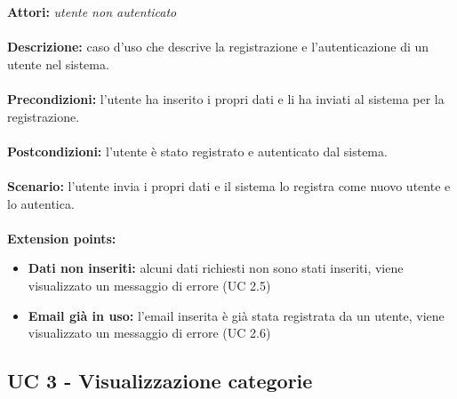 \documentclass[a4paper,11pt]{article}
\begin{document}
\textbf{Attori:} \textit{utente non autenticato}
\\ \\
\textbf{Descrizione:} caso d'uso che descrive la registrazione e l'autenticazione di un utente nel sistema.\\
\\
\textbf{Precondizioni:} l'utente ha inserito i propri dati e li ha inviati al sistema per la registrazione.\\
\\
\textbf{Postcondizioni:} l’utente è stato registrato e autenticato dal sistema.\\
\\
\textbf{Scenario:} l’utente invia i propri dati e il sistema lo registra come nuovo utente e lo autentica.\\
\\
\textbf{Extension points:} 
\begin{itemize}
	\item \textbf{Dati non inseriti:} alcuni dati richiesti non sono stati inseriti, viene visualizzato un messaggio di errore (UC 2.5)
	\item \textbf{Email già in uso:} l'email inserita è già stata registrata da un utente, viene visualizzato un messaggio di errore (UC 2.6)
\end{itemize}


\subsection{UC 3 - Visualizzazione categorie}
\end{document}
